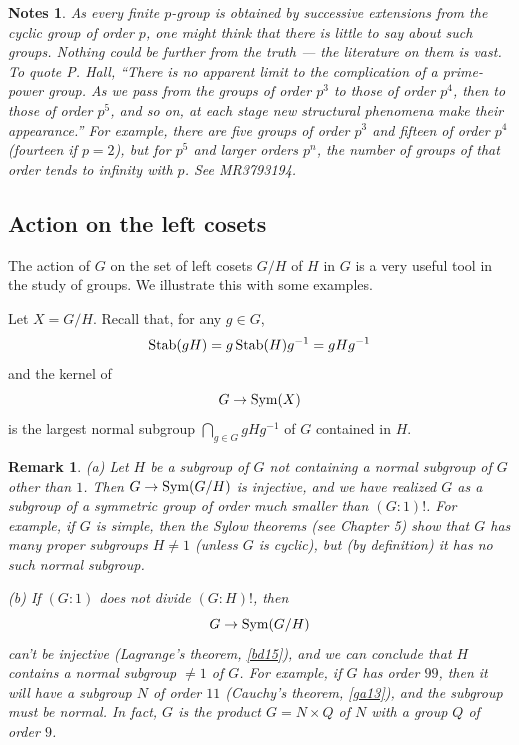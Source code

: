 \documentclass[a4paper,11pt,final]{memoir}%
\newtheorem{remark}[X]{Remark}
\newtheorem*{nt}{Notes}
\theoremstyle{nonumberplain}
\begin{document}
\begin{nt}
As every finite $p$-group is obtained by successive extensions from the cyclic
group of order $p$, one might think that there is little to say about such
groups. Nothing could be further from the truth --- the literature on them is
vast. To quote P. Hall, ``There is no apparent limit to the complication of a
prime-power group. As we pass from the groups of order $p^{3}$ to those of
order $p^{4}$, then to those of order $p^{5}$, and so on, at each stage new
structural phenomena make their appearance.'' For example, there are five
groups of order $p^{3}$ and fifteen of order $p^{4}$ (fourteen if $p=2$), but
for $p^{5}$ and larger orders $p^{n}$, the number of groups of that order
tends to infinity with $p$. See MR3793194.
\end{nt}

\subsection{Action on the left cosets}

The action of $G$ on the set of left cosets $G/H$ of $H$ in $G$ is a very
useful tool in the study of groups. We illustrate this with some examples.

Let $X=G/H$. Recall that, for any $g\in G$,
\[
\Stab(gH)=g\Stab(H)g^{-1}=gHg^{-1}%
\]
and the kernel of
\[
G\rightarrow\operatorname{Sym}(X)
\]
is the largest normal subgroup $\bigcap_{g\in G}gHg^{-1}$ of $G$ contained in
$H$.

\begin{remark}
\label{ga19} (a) Let $H$ be a subgroup of $G$ not containing a normal subgroup
of $G$ other than $1$. Then $G\rightarrow\operatorname{Sym}(G/H)$ is injective, and we have
realized $G$ as a subgroup of a symmetric group of order much smaller than
$(G:1)!$. For example, if $G$ is simple, then the Sylow theorems (see Chapter
5) show that $G$ has many proper subgroups $H\neq1$ (unless $G$ is cyclic),
but (by definition) it has no such normal subgroup.

(b) If $(G:1)$ does not divide $(G:H)!$, then
\[
G\rightarrow\operatorname{Sym}(G/H)
\]
can't be injective (Lagrange's theorem, \ref{bd15}), and we can conclude that
$H$ contains a normal subgroup $\neq1$ of $G$. For example, if $G$ has order
$99$, then it will have a subgroup $N$ of order $11$ (Cauchy's theorem,
\ref{ga13}), and the subgroup must be normal. In fact, $G$ is the product
$G=N\times Q$ of $N$ with a group $Q$ of order $9$.
\end{remark}
\end{document}
